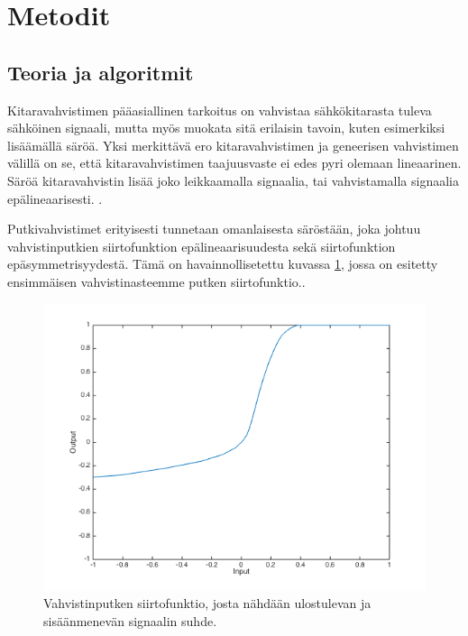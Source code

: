 \documentclass[11pt, a4paper, oneside]{article}
\begin{document}
\section{Metodit}

\subsection{Teoria ja algoritmit}

Kitaravahvistimen pääasiallinen tarkoitus on vahvistaa sähkökitarasta tuleva sähköinen signaali, mutta myös muokata sitä erilaisin tavoin, kuten esimerkiksi lisäämällä säröä. 
Yksi merkittävä ero kitaravahvistimen ja geneerisen vahvistimen välillä on se, että kitaravahvistimen taajuusvaste ei edes pyri olemaan lineaarinen. 
Säröä kitaravahvistin lisää joko leikkaamalla signaalia, tai vahvistamalla signaalia epälineaarisesti. . \cite{dafx}

Putkivahvistimet erityisesti tunnetaan omanlaisesta säröstään, joka johtuu vahvistinputkien siirtofunktion epälineaarisuudesta sekä siirtofunktion epäsymmetrisyydestä. 
Tämä on havainnollisetettu kuvassa \ref{fig:tube_transf}, jossa on esitetty ensimmäisen vahvistinasteemme putken siirtofunktio.. \cite{dafx}

\begin{figure}[h!]
\includegraphics[width=1\textwidth, center]{tube_transf.png} \newline
\caption{Vahvistinputken siirtofunktio, josta nähdään ulostulevan ja sisäänmenevän signaalin suhde.}
\label{fig:tube_transf}
\end{figure}
\end{document}
